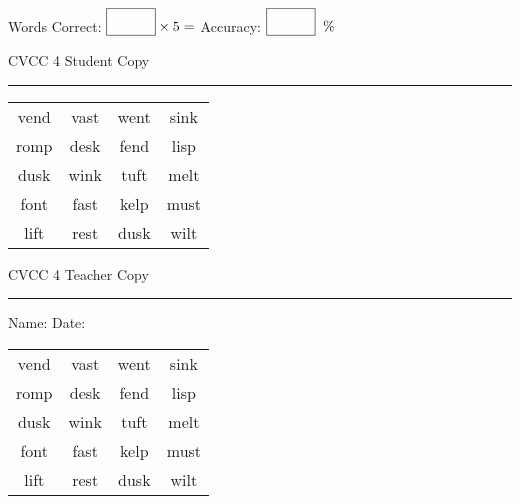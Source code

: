 \documentclass{memoir}
\begin{document}
\small

Words Correct: $\fbox{\phantom{\huge 100}} \times 5 = $ Accuracy: $\fbox{\phantom{\huge 100}}\;\; \%$ 

\vfill

\newpage


\footnotesize \noindent
CVCC 4 \hfill Student Copy
\smallskip
\hrule

\Large

\setlength{\tabcolsep}{14pt}
\def\arraystretch{3}

{\selectfont


\begin{vplace}[0.5]
\begin{center}
\begin{tabular}{cccc}
vend & vast & went & sink \\
romp & desk & fend & lisp \\
dusk & wink & tuft & melt \\
font & fast & kelp & must \\
lift & rest & dusk & wilt \\
\end{tabular}
\end{center}
\end{vplace}

}

\newpage

\footnotesize \noindent
CVCC 4 \hfill Teacher Copy
\smallskip
\hrule

\small

\vfill

\noindent
Name: \underline{\hspace{1.75in}} \hfill Date: \underline{\hspace{1in}}

\Large

{\selectfont


\begin{vplace}[0.5]
\begin{center}
\begin{tabular}{cccc}
vend & vast & went & sink \\
romp & desk & fend & lisp \\
dusk & wink & tuft & melt \\
font & fast & kelp & must \\
lift & rest & dusk & wilt \\
\end{tabular}
\end{center}
\end{vplace}



}
\end{document}
